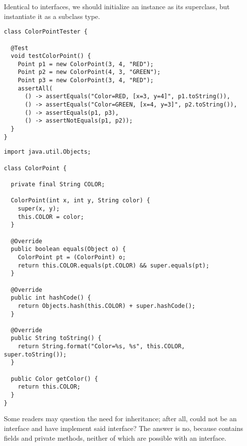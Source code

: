 Identical to interfaces, we should initialize an instance as its superclass, but instantiate it as a subclass type.

\begin{lstlisting}[language=MyJava]
class ColorPointTester {

  @Test
  void testColorPoint() {
    Point p1 = new ColorPoint(3, 4, "RED");
    Point p2 = new ColorPoint(4, 3, "GREEN");
    Point p3 = new ColorPoint(3, 4, "RED");
    assertAll(
      () -> assertEquals("Color=RED, [x=3, y=4]", p1.toString()),
      () -> assertEquals("Color=GREEN, [x=4, y=3]", p2.toString()),
      () -> assertEquals(p1, p3),
      () -> assertNotEquals(p1, p2));
  }
}
\end{lstlisting}

\begin{lstlisting}[language=MyJava]
import java.util.Objects;

class ColorPoint {

  private final String COLOR;

  ColorPoint(int x, int y, String color) {
    super(x, y);
    this.COLOR = color;
  }

  @Override
  public boolean equals(Object o) {
    ColorPoint pt = (ColorPoint) o;
    return this.COLOR.equals(pt.COLOR) && super.equals(pt);
  }

  @Override
  public int hashCode() {
    return Objects.hash(this.COLOR) + super.hashCode();
  }

  @Override
  public String toString() {
    return String.format("Color=%s, %s", this.COLOR, super.toString());
  }

  public Color getColor() {
    return this.COLOR;
  }
}
\end{lstlisting}

Some readers may question the need for inheritance; after all, could  not be an interface and have  implement said interface? 
The answer is no, because  contains fields and private methods, neither of which are possible with an interface.

\newpage %

